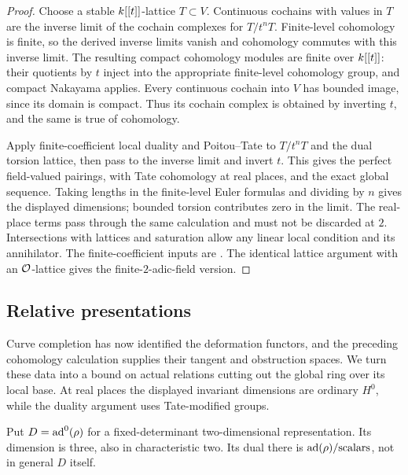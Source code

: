 \begin{proof}
Choose a stable $k[[t]]$-lattice $T\subset V$.  Continuous cochains
with values in $T$ are the inverse limit of the cochain complexes for
$T/t^nT$.  Finite-level cohomology is finite, so the derived inverse
limits vanish and cohomology commutes with this inverse limit.
The resulting compact cohomology modules are finite over
$k[[t]]$: their quotients by $t$ inject into the appropriate
finite-level cohomology group, and compact Nakayama applies.
Every continuous cochain into $V$ has bounded image, since its domain
is compact.  Thus its cochain complex is obtained by inverting $t$,
and the same is true of cohomology.

Apply finite-coefficient local duality and Poitou--Tate to $T/t^nT$
and the dual torsion lattice, then pass to the inverse limit and
invert $t$.  This gives the perfect field-valued pairings, with
Tate cohomology at real places, and the exact global sequence.
Taking lengths in the finite-level Euler
formulas and dividing by $n$ gives the displayed dimensions; bounded
torsion contributes zero in the limit.  The real-place terms pass
through the same calculation and must not be discarded at $2$.
Intersections with lattices and saturation allow any linear local
condition and its annihilator.  The finite-coefficient inputs are
\cite[I, Corollary~2.3, Theorems~2.8, 2.13, 4.10 and~5.1]{Milne2006}.
The identical lattice argument with an $\mathcal O$-lattice gives the
finite-$2$-adic-field version.
\end{proof}

\subsection{Relative presentations}

Curve completion has now identified the deformation functors, and
the preceding cohomology calculation supplies their tangent and
obstruction spaces. We turn these data into a bound on actual
relations cutting out the global ring over its local base. At real
places the displayed invariant dimensions are ordinary \(H^0\),
while the duality argument uses Tate-modified groups.

Put $D=\operatorname{ad}^0(\rho)$ for a fixed-determinant two-dimensional
representation.  Its dimension is three, also in characteristic two.
Its dual there is $\operatorname{ad}(\rho)/\text{scalars}$, not in general $D$
itself.

